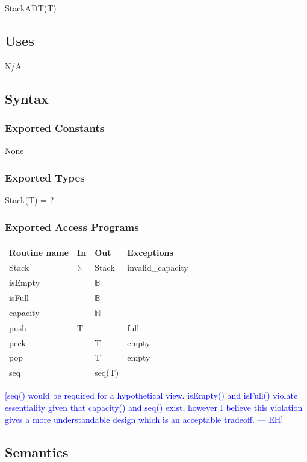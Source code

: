 \documentclass[12pt]{article}
\newcommand{\rem}[1]{\textcolor{blue}{[#1 --- EH]}}
\begin{document}
StackADT(T)

\subsection*{Uses}

N/A

\subsection*{Syntax}

\subsubsection*{Exported Constants}

None

\subsubsection*{Exported Types}

Stack(T) = ?

\subsubsection*{Exported Access Programs}

\begin{tabular}{| l | l | l | l |}
\hline
\textbf{Routine name} & \textbf{In} & \textbf{Out} & \textbf{Exceptions}\\
\hline
Stack & $\mathbb{N}$ & Stack & invalid\_capacity\\
\hline
isEmpty & ~ & $\mathbb{B}$ & ~\\
\hline
isFull & ~ & $\mathbb{B}$ & ~\\
\hline
capacity & ~ & $\mathbb{N}$ & ~\\
\hline
push & T & ~ & full\\
\hline
peek & ~ & T & empty\\
\hline
pop & ~ & T & empty\\
\hline
seq & ~ & seq(T) & ~\\
\hline
\end{tabular}

\noindent\rem{seq() would be required for a hypothetical view.
isEmpty() and isFull() violate essentiality given that capacity() and seq()
exist, however I believe this violation gives a more understandable design which
is an acceptable tradeoff.}

\subsection*{Semantics}
\end{document}
